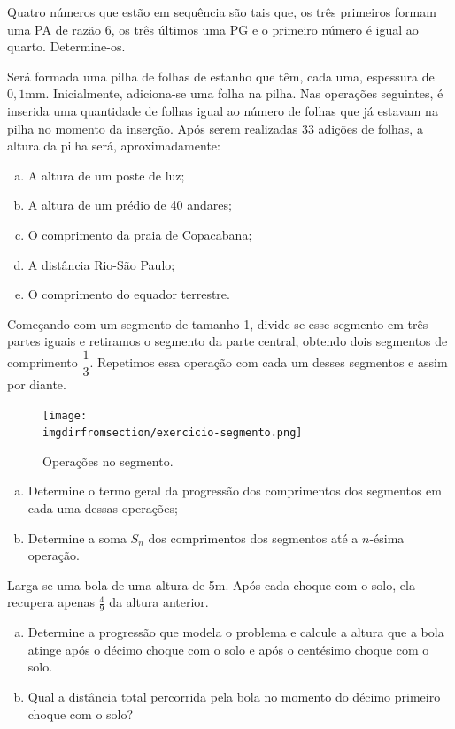 \begin{exercise}
    Quatro números que estão em sequência são tais que, os três
primeiros formam uma PA de razão 6, os três últimos uma PG e o
primeiro número é igual ao quarto. Determine-os.
\end{exercise}

\begin{exercise}
Será formada uma pilha de folhas de estanho que têm, cada uma,
espessura de $0,1$mm. Inicialmente, adiciona-se uma folha na pilha.
Nas operações seguintes, é inserida uma quantidade de folhas igual
ao número de folhas que já estavam na pilha no momento da inserção.
Após serem realizadas 33 adições de folhas, a altura da pilha será,
aproximadamente:
\begin{enumerate}[a.]
  \item A altura de um poste de luz;
  \item A altura de um prédio de 40 andares;
  \item O comprimento da praia de Copacabana;
  \item A distância Rio-São Paulo;
  \item O comprimento do equador terrestre.
\end{enumerate}
\end{exercise}

\begin{exercise}
    Começando com um segmento de tamanho 1, divide-se esse segmento em três partes iguais e retiramos o segmento da parte central, obtendo dois segmentos de comprimento $\dfrac 1 3$. Repetimos essa operação com cada um desses segmentos e assim por diante.
    \begin{figure}[H]
        \centering
        \label{fig:exercicio-segmento}
        \texttt{[image: \\imgdirfromsection/exercicio-segmento.png]}
	\caption{Operações no segmento.}
    \end{figure}
    \begin{enumerate}[a)]
	\item Determine o termo geral da progressão dos comprimentos dos segmentos em cada uma dessas operações;
	\item Determine a soma $S_n$ dos comprimentos dos segmentos até a $n$-ésima operação.
    \end{enumerate}
\end{exercise}

\begin{exercise}
    Larga-se uma bola de uma altura de 5m. Após cada choque com o
solo, ela recupera apenas $\frac 4 9 $ da altura anterior. 
%
\begin{enumerate}[a.]
    \item Determine a progressão que modela o problema e calcule 
    a altura que a bola atinge após o décimo choque com o solo
    e após o centésimo choque com o solo.
    \item Qual a distância total percorrida pela bola no momento 
    do décimo primeiro choque com o solo? 
\end{enumerate}
\end{exercise}

